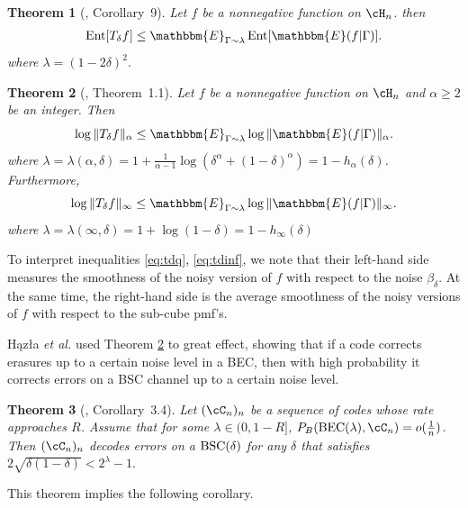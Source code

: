 \documentclass{amsart}
\newtheorem{theorem}{Theorem}[section]
\theoremstyle{remark}
\DeclareMathOperator{\Ent}{Ent}
\begin{document}
\begin{theorem}[\cite{samorodnitsky2016entropy}, Corollary~9] \label{thm: Samorodnitsky's inequality for entropy}
    Let $f$ be a nonnegative function on $\cH_n$. then 
    \begin{align*}
        \Ent[T_{\delta}f] \leq \mathbbm{E}_{\Gamma \sim \lambda} \Ent[\mathbbm{E}(f|\Gamma)]. 
    \end{align*}
    where $\lambda  = (1-2\delta)^2.$   
\end{theorem}

\begin{theorem}[\cite{samorodnitsky2020improved}, Theorem~1.1]\label{thm: Samorodnitsky's inequality for norms}
    Let $f$ be a nonnegative function on $\cH_n$ and $\alpha \geq 2$ be an integer. Then
    \begin{equation}\label{eq:tdq}
        \log\|T_{\delta}f\|_{\alpha}  \leq \mathbbm{E}_{\Gamma \sim \lambda}\log\|\mathbbm{E}(f|\Gamma)\|_{\alpha} . 
    \end{equation}
    where $\lambda = \lambda(\alpha,\delta) = 1+\frac{1}{\alpha -1}\log(\delta^{\alpha}  +(1-\delta)^{\alpha} ) = 1-h_{\alpha} (\delta)$.
    Furthermore,
    \begin{equation}\label{eq:tdinf}
        \log\|T_{\delta}f\|_{\infty} \leq \mathbbm{E}_{\Gamma \sim \lambda}\log\|\mathbbm{E}(f|\Gamma)\|_{\infty}. 
    \end{equation}
    where $\lambda = \lambda(\infty,\delta) = 1+\log(1-\delta)= 1-h_{\infty}(\delta) $
\end{theorem}
To interpret inequalities \eqref{eq:tdq}, \eqref{eq:tdinf}, we note that their left-hand side measures the smoothness of the noisy version of $f$ with respect to the noise $\beta_{\delta}$. At the same time, the right-hand side is the average smoothness of the noisy versions of $f$ with respect to the sub-cube pmf's.

H{\k a}z\l{}a \emph{et al.} \cite{hkazla2021codes} used Theorem \ref{thm: Samorodnitsky's inequality for norms} to great effect, showing that if a code corrects erasures up to a certain noise level in a BEC, then with high probability it corrects errors on a BSC channel up to a certain noise level.

\begin{theorem}[\cite{hkazla2021codes}, Corollary~3.4]\label{prop: Good erasure correcting codes in in BSC}
 Let $(\cC_n)_n$ be a sequence of codes whose rate approaches $R$. Assume 
that for some $\lambda \in (0,1-R]$, $P_B({\text{\rm BEC}}(\lambda),\cC_n) = o(\frac{1}{n})$. Then $(\cC_n)_n$ decodes errors on a ${\text{\rm BSC}}(\delta)$ for 
any $\delta$ that satisfies $2\sqrt{\delta(1-\delta)}<2^{\lambda}-1.$\
\end{theorem}
This theorem implies the following corollary.
\end{document}
